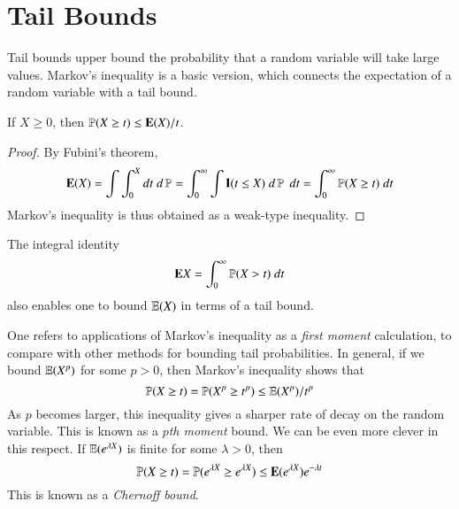 
\section{Tail Bounds}

Tail bounds upper bound the probability that a random variable will take large values. Markov's inequality is a basic version, which connects the expectation of a random variable with a tail bound.

\begin{theorem}
    If $X \geq 0$, then $\operatorname{\mathbb{P}}(X \geq t) \leq \mathbf{E}(X) / t$.
\end{theorem}
\begin{proof}
    By Fubini's theorem,
    \[ \mathbf{E}(X) = \int \int_0^X dt\; d\operatorname{\mathbb{P}} = \int_0^\infty \int \mathbf{I}(t \leq X)\; d\operatorname{\mathbb{P}}\; dt = \int_0^\infty \operatorname{\mathbb{P}}(X \geq t)\; dt \]
    Markov's inequality is thus obtained as a weak-type inequality.
\end{proof}

\begin{remark}
    The integral identity
    \[ \mathbf{E} X = \int_0^\infty \operatorname{\mathbb{P}}(X > t)\; dt \]
    also enables one to bound $\operatorname{\mathbb{E}}(X)$ in terms of a tail bound.
\end{remark}

One refers to applications of Markov's inequality as a \emph{first moment} calculation, to compare with other methods for bounding tail probabilities. In general, if we bound $\operatorname{\mathbb{E}}(X^p)$ for some $p > 0$, then Markov's inequality shows that
%
\[ \mathbb{P}(X \geq t) = \mathbb{P}(X^p \geq t^p) \leq \operatorname{\mathbb{E}}(X^p)/t^p \]
%
As $p$ becomes larger, this inequality gives a sharper rate of decay on the random variable. This is known as a \emph{$p$th moment} bound. We can be even more clever in this respect. If $\operatorname{\mathbb{E}}(e^{\lambda X})$ is finite for some $\lambda > 0$, then
%
\[ \operatorname{\mathbb{P}}(X \geq t) = \operatorname{\mathbb{P}}(e^{\lambda X} \geq e^{\lambda X}) \leq \mathbf{E}(e^{\lambda X}) e^{-\lambda t} \]
%
This is known as a \emph{Chernoff bound}.

